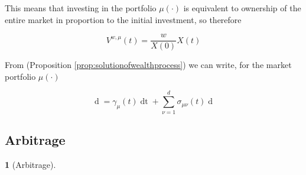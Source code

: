 \documentclass[british]{amsart}
\numberwithin{equation}{section}
\numberwithin{figure}{section}
\theoremstyle{plain}
\theoremstyle{definition}
\newtheorem{defn}[thm]{\protect\definitionname}
\theoremstyle{plain}
\theoremstyle{plain}
\theoremstyle{plain}
\theoremstyle{remark}
\theoremstyle{plain}
\providecommand{\definitionname}{Definition}
\renewcommand{\d}[1]{\mathop{\mathrm{d}{#1}}}
\begin{document}
This means that investing in the portfolio $\mu(\cdot)$ is equivalent to ownership of
the entire market in proportion to the initial investment, so therefore

\begin{equation}
		V^{w,\mu}(t) = \frac{w}{X(0)}X(t)	
\end{equation}

From (Proposition \ref{prop:solutionofwealthprocess}) we can write, for the market portfolio
$\mu(\cdot)$

\begin{equation}
	\d{V^{w,\mu}(t)} =  
			\gamma_{\mu}(t) \d{t} +
			\sum_{\nu=1}^{d} \sigma_{\mu\nu}(t) \d{W_{\nu}(t)}
\end{equation}




\subsection{Arbitrage}

\begin{defn} [Arbitrage]
	\label{def:portfolio}
\end{defn}

\printbibliography
\end{document}
